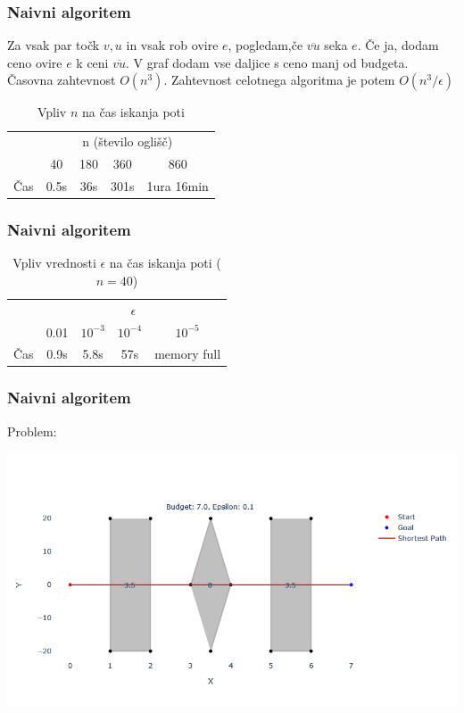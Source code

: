 \documentclass{beamer}
\begin{document}
\begin{frame}
    \frametitle{Naivni algoritem}
    Za vsak par točk $v,u$ in vsak rob ovire $e$, pogledam,če $\overline{vu}$ seka $e$. Če ja, dodam ceno ovire $e$ k ceni $\overline{vu}$. V graf dodam vse daljice s ceno manj od budgeta.
    \pause
    Časovna zahtevnost $O(n^3)$. Zahtevnost celotnega algoritma je potem  $O(n^3/\epsilon)$
    \pause
    \begin{table}[h]
        \centering
        \begin{tabular}{|c|c|c|c|c|}
            \hline
            & \multicolumn{4}{c|}{n (število oglišč)} \\
            \cline{2-5}
            & 40 & 180 & 360 & 860 \\
            \hline
            Čas & 0.5s & 36s &  301s &  1ura 16min\\
            \hline
        \end{tabular}
        \caption{Vpliv $n$ na čas iskanja poti}
        \label{tab:1}
    \end{table}

\end{frame}

\begin{frame}
    \frametitle{Naivni algoritem}
   
    \begin{table}[h]
        \centering
        \begin{tabular}{|c|c|c|c|c|}
            \hline
            & \multicolumn{4}{c|}{$\epsilon$} \\
            \cline{2-5}
            & 0.01 & $10^{-3}$ & $10^{-4}$ & $10^{-5}$ \\
            \hline
            Čas & 0.9s & 5.8s &  57s & memory full \\
            \hline
           
        \end{tabular}
        \caption{Vpliv vrednosti $\epsilon$ na čas iskanja poti ($n = 40$)}
        \label{tab:2}
    \end{table}


\end{frame}

\begin{frame}
    \frametitle{Naivni algoritem}
    Problem:

    \includegraphics[width=1\textwidth]{naiveErr.png}
\end{frame}
\end{document}
